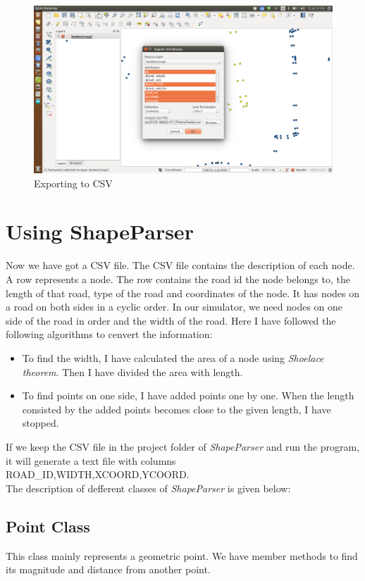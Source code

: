 \documentclass[12pt]{article}
\begin{document}
\begin{figure}
\centering
\includegraphics[scale=.25]{qgis03.png}
\caption{Exporting to CSV}
\end{figure}


\section*{Using ShapeParser}
Now we have got a CSV file. The CSV file contains the description of each node. A row represents a node. The row contains the road id the node belongs to, the length of that road, type of the road and coordinates of the node. It has nodes on a road on both sides in a cyclic order. In our simulator, we need nodes on one side of the road in order and the width of the road. Here I have followed the following algorithms to cenvert the information:
\begin{itemize}
\item To find the width, I have calculated the area of a node using \textit{Shoelace theorem}. Then I have divided the area with length.
\item To find points on one side, I have added points one by one. When the length consisted by the added points becomes close to the given length, I have stopped.
\end{itemize}

If we keep the CSV file in the project folder of \textit{ShapeParser} and run the program, it will generate a text file with columns ROAD\_ID,WIDTH,XCOORD,YCOORD.\\

The description of defferent classes of \textit{ShapeParser} is given below:
\subsection*{Point Class}
This class mainly represents a geometric point. We have member methods to find its magnitude and distance from another point.
\end{document}
